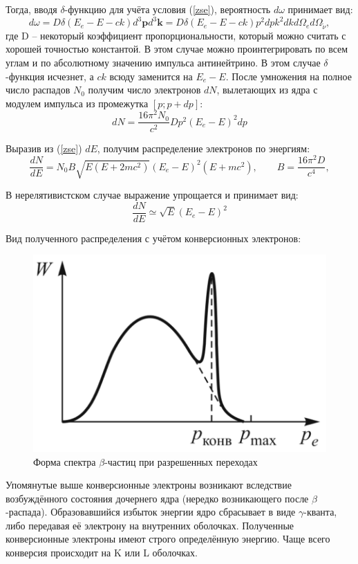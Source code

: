 \documentclass[a4paper,12pt]{article}
\theoremstyle{plain} %
\theoremstyle{definition} %
\theoremstyle{remark} %
\begin{document}
	Тогда, вводя $\delta$-функцию для учёта условия (\ref{zse}), вероятность $d\omega$ принимает вид:
	\begin{equation}
	d\omega = D\delta(E_e-E-ck)d^3\mathbf{p}d^3\mathbf{k} = D\delta(E_e-E-ck)p^2d pk^2d kd\Omega_ed\Omega_{\widetilde{\nu}},
	\end{equation}
	где D -- некоторый коэффициент пропорциональности, который можно считать с хорошей точностью константой. В этом случае можно проинтегрировать по всем углам и по абсолютному значению импульса антинейтрино. В этом случае $\delta$-функция исчезнет, а $ck$ всюду заменится на $E_e-E$. После умножения на полное число распадов $N_0$ получим число электронов $dN$, вылетающих из ядра с модулем импульса из промежутка $[p;p+dp]$:
	\begin{equation}
	d N = \frac{16\pi^2N_0}{c^2} D p^2\left(E_e-E\right)^2d p
	\end{equation}
	
	Выразив из (\ref{zse}) $dE$, получим распределение электронов по энергиям:
	\begin{equation}
	\dfrac{dN}{dE} = N_0B\sqrt{E(E+2mc^2)}(E_e - E)^2(E + mc^2), \qquad B = \dfrac{16\pi^2D }{c^4},
	\end{equation}
	
	В нерелятивистском случае выражение упрощается и принимает вид:
	\begin{equation}
	\frac{d N}{d E} \simeq \sqrt{E}(E_e - E)^2
	\end{equation} 
	
	Вид полученного распределения с учётом конверсионных электронов: 
	\begin{figure}[h!]
		\centering
		\includegraphics[width=0.38\linewidth]{pic1}
		\caption{Форма спектра $\beta$-частиц при разрешенных переходах}
	\end{figure}

	Упомянутые выше конверсионные электроны возникают вследствие возбуждённого состояния дочернего ядра (нередко возникающего после $\beta$-распада). Образовавшийся избыток энергии ядро сбрасывает в виде $\gamma$-кванта, либо передавая её электрону на внутренних оболочках. Полученные конверсионные электроны имеют строго определённую энергию. Чаще всего  конверсия происходит на K или L оболочках.
\end{document}
